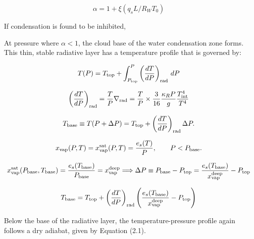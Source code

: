 \documentclass[11pt]{ucscthesisbs}
\begin{document}
\begin{equation}
  \alpha = 1 + \xi (q_{s} L / R_{W} T_{0}) 
\end{equation}

If condensation is found to be inhibited,  

At pressure where $\alpha < 1$, the cloud base of the water condensation zone forms. This thin, stable radiative layer has a temperature profile that is governed by:

\begin{equation}
	T(P) = T_{\rm top} + \int_{P_{\rm top}}^P\left(\frac{dT}{dP}\right)_{\rm rad}\,d P
\end{equation}

\begin{equation}
  \left(\frac{dT}{dP}\right)_{\rm rad}=\frac{T}{P}\nabla_{\rm rad} = \frac{T}{P}\times\frac{3}{16}\frac{\kappa_R P}{g}\frac{T_{\rm int}^4}{T^4}
\end{equation}

\begin{equation}
	T_{\rm base}\equiv T(P+\Delta P) = T_{\rm top} + \left(\frac{dT}{dP}\right)_{\rm rad}\Delta P.
\end{equation}

\begin{equation}
	x_{\rm vap}(P, T) = x_{\rm vap}^{\rm sat}(P, T) = \frac{e_s(T)}{P}, \qquad P<P_{\rm base}.
\end{equation}

\begin{equation}
x_{\rm vap}^{\rm sat}(P_{\rm base}, T_{\rm base}) = \frac{e_s(T_{\rm base})}{P_{\rm base}}=x_{\rm vap}^{\rm deep}
\Longrightarrow \Delta P \equiv P_{\rm base}-P_{\rm top} = \frac{e_s(T_{\rm base})}{x_{\rm vap}^{\rm deep}} - P_{\rm top}
\end{equation}

\begin{equation}
	T_{\rm base} = T_{\rm top} + \left(\frac{dT}{dP}\right)_{\rm rad}\left(\frac{e_s(T_{\rm base})}{x_{\rm vap}^{\rm deep}} - P_{\rm top}\right)
\end{equation}

Below the base of the radiative layer, the temperature-pressure profile again follows a dry adiabat, given by Equation (2.1).



\end{document}
